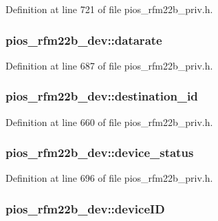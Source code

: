 Definition at line 721 of file pios\-\_\-rfm22b\-\_\-priv.\-h.

\hypertarget{structpios__rfm22b__dev_aff7a6133350534d9bdb99e8e4856dd6e}{
\subsubsection[{datarate}]{ pios\-\_\-rfm22b\-\_\-dev\-::datarate}}\label{structpios__rfm22b__dev_aff7a6133350534d9bdb99e8e4856dd6e}


Definition at line 687 of file pios\-\_\-rfm22b\-\_\-priv.\-h.

\hypertarget{structpios__rfm22b__dev_ada47e039e7ba782c44b154fce01005eb}{
\subsubsection[{destination\-\_\-id}]{ pios\-\_\-rfm22b\-\_\-dev\-::destination\-\_\-id}}\label{structpios__rfm22b__dev_ada47e039e7ba782c44b154fce01005eb}


Definition at line 660 of file pios\-\_\-rfm22b\-\_\-priv.\-h.

\hypertarget{structpios__rfm22b__dev_aa6ea2086a901b33a1f0f1535f378cdfc}{
\subsubsection[{device\-\_\-status}]{ pios\-\_\-rfm22b\-\_\-dev\-::device\-\_\-status}}\label{structpios__rfm22b__dev_aa6ea2086a901b33a1f0f1535f378cdfc}


Definition at line 696 of file pios\-\_\-rfm22b\-\_\-priv.\-h.

\hypertarget{structpios__rfm22b__dev_ac608ccb62cbd144c8053aaacb8c14fcf}{
\subsubsection[{device\-I\-D}]{ pios\-\_\-rfm22b\-\_\-dev\-::device\-I\-D}}\label{structpios__rfm22b__dev_ac608ccb62cbd144c8053aaacb8c14fcf}


